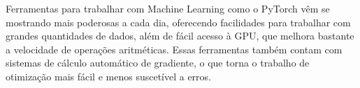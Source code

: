 

Ferramentas para trabalhar
com Machine Learning como o
PyTorch vêm se mostrando
mais poderosas
a cada dia, oferecendo
facilidades para trabalhar 
com grandes quantidades de dados,
além de fácil acesso à GPU,
que melhora bastante a velocidade
de operações aritméticas.
Essas ferramentas também 
contam com sistemas de cálculo automático
de gradiente, o que torna o trabalho
de otimização mais fácil e
menos suscetível a erros.






